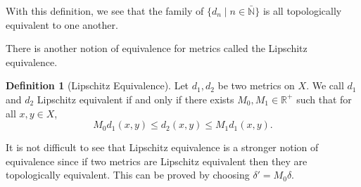 \documentclass[
]{article}
\theoremstyle{definition}
\newtheorem{definition}{Definition}[section]
\begin{document}
With this definition, we see that the family of
\(\{d_n \mid n \in \bar{\mathbb{N}}\}\) is all topologically equivalent
to one another.

There is another notion of equivalence for metrics called the Lipschitz
equivalence.

\begin{definition}[Lipschitz Equivalence]
  Let \(d_1, d_2\) be two metrics on \(X\). We call \(d_1\) and \(d_2\) 
  Lipschitz equivalent if and only if there exists \(M_0, M_1 \in \mathbb{R}^+\) 
  such that for all \(x, y \in X\),
  \[M_0 d_1(x, y) \le d_2(x, y) \le M_1 d_1(x, y).\] 
\end{definition}

It is not difficult to see that Lipschitz equivalence is a stronger
notion of equivalence since if two metrics are Lipschitz equivalent then
they are topologically equivalent. This can be proved by choosing
\(\delta' = M_0\delta\).
\end{document}

